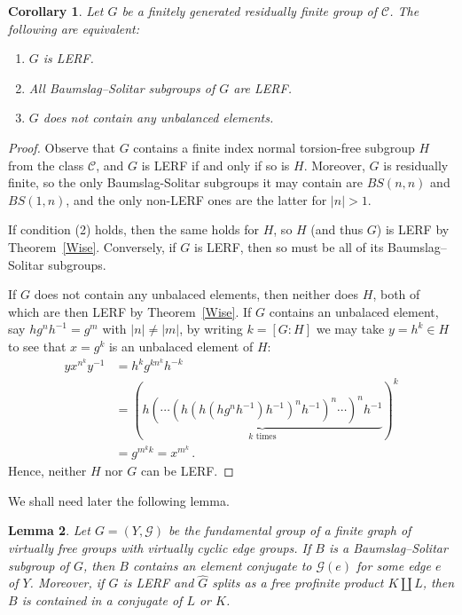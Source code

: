 \documentclass[a4paper]{amsart}
\newtheorem{lem}{Lemma}[section]
\newtheorem{cor}[lem]{Corollary}
\theoremstyle{definition}
\theoremstyle{remark}
\newcommand{\G}{\mathcal G}
\begin{document}
\begin{cor}\label{RF-LERF} Let \(G\) be a finitely generated residually finite group of \(\mathcal{C}\). The following are equivalent:
\begin{enumerate}
    \item \(G\) is LERF.
    \item All Baumslag--Solitar subgroups of \(G\) are LERF.
    \item \(G\) does not contain any unbalanced elements.
\end{enumerate}
\end{cor}
\begin{proof} Observe that \(G\) contains a finite index normal torsion-free subgroup \(H\) from the class \(\mathcal{C}\), and \(G\) is LERF if and only if so is \(H\). Moreover, \(G\) is residually finite, so the only Baumslag-Solitar subgroups it may contain are \(BS(n,n)\) and \(BS(1,n)\), and the only non-LERF ones are the latter for \(|n| > 1\).

If condition (2) holds, then the same holds for \(H\), so \(H\) (and thus \(G\)) is LERF by Theorem~\ref{Wise}. Conversely, if \(G\) is LERF, then so must be all of its Baumslag--Solitar subgroups.

If \(G\) does not contain any unbalaced elements, then neither does \(H\), both of which are then LERF by Theorem~\ref{Wise}. If \(G\) contains an unbalaced element, say \(hg^nh^{-1} = g^m\) with \(|n| \neq |m|\), by writing \(k = [G\colon H]\) we may take \(y = h^k \in H\) to see that \(x = g^k\) is an unbalaced element of \(H\):
\begin{align*}
    yx^{n^k}y^{-1} &= h^kg^{kn^k}h^{-k}\\
    &= \left(\underbrace{h(\cdots (h(h(hg^nh^{-1})h^{-1})^nh^{-1})^n\cdots )^nh^{-1}}_{k \text{ times}}\right)^k\\
    &= g^{m^kk} = x^{m^k}\,.
\end{align*}
Hence, neither \(H\) nor \(G\) can be LERF.
\end{proof}

We shall need later the following lemma.

\begin{lem}\label{BSsubgroups} Let \(G=(Y,\G)\) be the fundamental group of a finite graph of virtually free groups with virtually cyclic edge groups. If \(B\) is a Baumslag--Solitar subgroup of \(G\), then \(B\) contains an element conjugate to \(\G(e)\) for some edge \(e\) of \(Y\). Moreover, if \(G\) is LERF and \(\widehat{G}\) splits as a free profinite product \(K\amalg L\), then \(B\) is contained in a conjugate of \(L\) or \(K\).
\end{lem}
\end{document}
